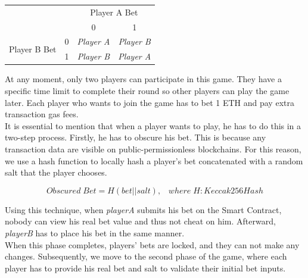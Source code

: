 \documentclass[12pt,a4paper]{article}
\begin{document}
\begin{table}[htpb]
    \begin{center}
        \begin{tabular}{lccc}
                                                              & \multicolumn{1}{l}{}   & \multicolumn{2}{c}{Player A Bet}                                                \\
                                                              &                        & 0                                      & 1                                      \\ \cline{3-4} 
            \multicolumn{1}{c}{\multirow{2}{*}{Player B Bet}} & \multicolumn{1}{c|}{0} & \multicolumn{1}{c|}{\textit{Player A}} & \multicolumn{1}{c|}{\textit{Player B}} \\ \cline{3-4} 
            \multicolumn{1}{c}{}                              & \multicolumn{1}{c|}{1} & \multicolumn{1}{c|}{\textit{Player B}} & \multicolumn{1}{c|}{\textit{Player A}} \\ \cline{3-4} 
        \end{tabular}
    \end{center}
\end{table}

At any moment, only two players can participate in this game.
They have a specific time limit to complete their round so other
players can play the game later. Each player who wants to join the
game has to bet 1 ETH and pay extra transaction gas fees. \\

It is essential to mention that when a player wants to play, he has to
do this in a two-step process. Firstly, he has to obscure his bet.
This is because any transaction data are visible on public-permissionless blockchains.
For this reason, we use a hash function to locally hash a player's bet
concatenated with a random salt that the player chooses.

\begin{center}
    \[Obscured \; Bet = H( bet || salt ), \;\;\; where \; H: Keccak256Hash\]
\end{center}

Using this technique, when \emph{playerA} submits his bet on the Smart Contract,
nobody can view his real bet value and thus not cheat on him. Afterward,
\emph{playerB} has to place his bet in the same manner. \\

When this phase completes, players' bets are locked, and they can not make
any changes. Subsequently, we move to the second phase of the game, where
each player has to provide his real bet and salt to validate their initial bet inputs. \\
\end{document}
